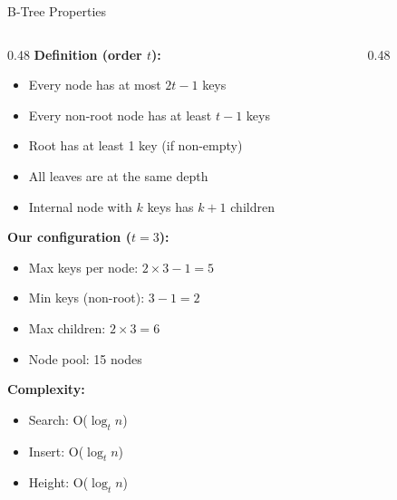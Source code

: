\documentclass[aspectratio=169, 10pt]{beamer}
\begin{document}
\begin{frame}{B-Tree Properties}
\begin{columns}[T]
\begin{column}{0.48\textwidth}
\textbf{Definition (order $t$):}
\begin{itemize}
  \item Every node has at most $2t - 1$ keys
  \item Every non-root node has at least $t - 1$ keys
  \item Root has at least 1 key (if non-empty)
  \item All leaves are at the same depth
  \item Internal node with $k$ keys has $k + 1$ children
\end{itemize}

\vspace{0.5em}
\textbf{Our configuration ($t = 3$):}
\begin{itemize}
  \item Max keys per node: $2 \times 3 - 1 = 5$
  \item Min keys (non-root): $3 - 1 = 2$
  \item Max children: $2 \times 3 = 6$
  \item Node pool: 15 nodes
\end{itemize}

\vspace{0.5em}
\textbf{Complexity:}
\begin{itemize}
  \item Search: O($\log_t n$)
  \item Insert: O($\log_t n$)
  \item Height: O($\log_t n$)
\end{itemize}
\end{column}

\begin{column}{0.48\textwidth}
\begin{center}
\end{center}


\end{column}
\end{columns}
\end{frame}
\end{document}
